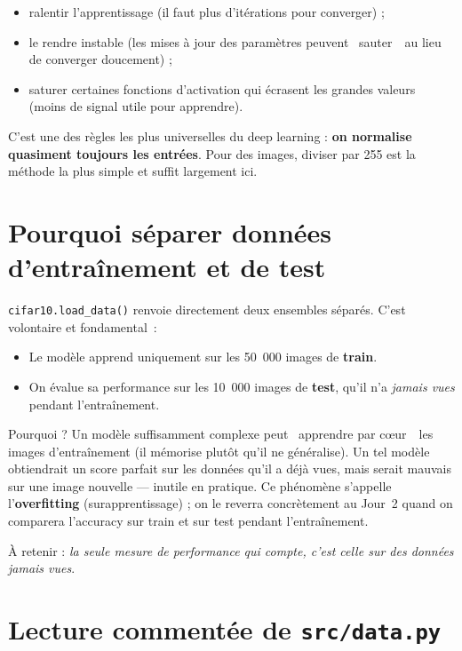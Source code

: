 \documentclass[11pt,a4paper]{article}
\begin{document}
\begin{itemize}[nosep]
  \item ralentir l'apprentissage (il faut plus d'it\'erations pour
  converger) ;
  \item le rendre instable (les mises \`a jour des param\`etres peuvent
  \guillemotleft~sauter~\guillemotright\ au lieu de converger doucement) ;
  \item saturer certaines fonctions d'activation qui \'ecrasent les
  grandes valeurs (moins de signal utile pour apprendre).
\end{itemize}

C'est une des r\`egles les plus universelles du deep learning : \textbf{on
normalise quasiment toujours les entr\'ees}. Pour des images, diviser par
255 est la m\'ethode la plus simple et suffit largement ici.

\section{Pourquoi s\'eparer donn\'ees d'entra\^inement et de test}

\texttt{cifar10.load\_data()} renvoie directement deux ensembles
s\'epar\'es. C'est volontaire et fondamental~:

\begin{itemize}
  \item Le mod\`ele apprend uniquement sur les 50~000 images de
  \textbf{train}.
  \item On \'evalue sa performance sur les 10~000 images de
  \textbf{test}, qu'il n'a \emph{jamais vues} pendant l'entra\^inement.
\end{itemize}

Pourquoi ? Un mod\`ele suffisamment complexe peut \guillemotleft~apprendre par
c\oe{}ur~\guillemotright\ les images d'entra\^inement (il m\'emorise plut\^ot qu'il ne
g\'en\'eralise). Un tel mod\`ele obtiendrait un score parfait sur les
donn\'ees qu'il a d\'ej\`a vues, mais serait mauvais sur une image
nouvelle --- inutile en pratique. Ce ph\'enom\`ene s'appelle
l'\textbf{overfitting} (surapprentissage) ; on le reverra concr\`etement
au Jour~2 quand on comparera l'accuracy sur train et sur test pendant
l'entra\^inement.

\`A retenir : \emph{la seule mesure de performance qui compte, c'est
celle sur des donn\'ees jamais vues}.

\section{Lecture comment\'ee de \texttt{src/data.py}}
\end{document}

